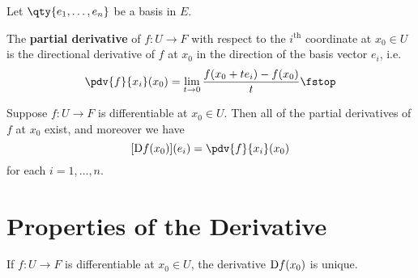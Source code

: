 Let \( \qty{e_1,\dots, e_n} \) be a basis in \( E \).

\begin{definition}
  The \textbf{partial derivative} of \( f:U\to F \) with respect to the \( i^{\text{th}} \) coordinate at \( x_0\in U \) is the directional derivative of \( f \) at \( x_0 \) in the direction of the basis vector \( e_i \), i.e.\
  \[ {\pdv{f}{x_i}} (x_0)=\lim_{t\to 0}\frac{f(x_0+te_i)-f(x_0)}{t}\fstop \]
\end{definition}

\begin{corollary}
  Suppose \( f:U\to F \) is differentiable at \( x_0\in U \). Then all of the partial derivatives of \( f \) at \( x_0 \) exist, and moreover we have
  \[ [\D f(x_0)](e_i)={\pdv{f}{x_i}}(x_0) \]
  for each \( i=1,\dots, n \).
\end{corollary}

\section{Properties of the Derivative}
\begin{proposition}
  If \( f:U\to F \) is differentiable at \( x_0\in U \), the derivative \( \text{D} f(x_0) \) is unique.
\end{proposition}

